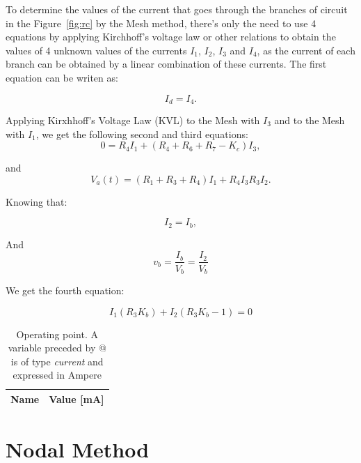 To determine the values of the current that goes through the branches of circuit in the Figure~\ref{fig:rc} by the Mesh method, there's only the need to use 4 equations by applying Kirchhoff's voltage law or other relations to obtain the values of 4 unknown values of the currents $I_1$, $I_2$, $I_3$ and $I_4$, as the current of each branch can be obtained by a linear combination of these currents.
	The first equation can be writen as:

\begin{equation}
  I_d = I_4.
  \label{eq:kvl}
\end{equation}

Applying Kirxhhoff's Voltage Law (KVL) to the Mesh with $I_3$ and to the Mesh with $I_1$, we get the following second and third equations:
\begin{equation}
  0 = R_4I_1 + (R_4 + R_6 + R_7-K_c)I_3,
\end{equation}

and
\begin{equation}
  V_a(t) = (R_1 + R_3 + R_4)I_1 + R_4I_3 R_3I_2.
  \label{eq:kvl2}
\end{equation}

Knowing that:

\begin{equation}
  I_2 = I_b,
  \label{eq:vo_sol}
\end{equation}

And
\begin{equation}
  v_b = \frac{I_b}{V_b} = \frac{I_2}{V_b}
  \label{eq:vo_nat}
\end{equation}

We get the fourth equation:

\begin{equation}
  I_1(R_3K_b) + I_2(R_3K_b -1) = 0 
\end{equation}

\begin{table}[h]
  \centering
  \begin{tabular}{|l|r|}
    \hline    
    {\bf Name} & {\bf Value [mA]} \\ \hline
    
  \end{tabular}
  \caption{Operating point. A variable preceded by @ is of type {\em current}
    and expressed in Ampere}
  \label{tab:op}
\end{table}

\section{Nodal Method}\label{sec:frequency-response}

